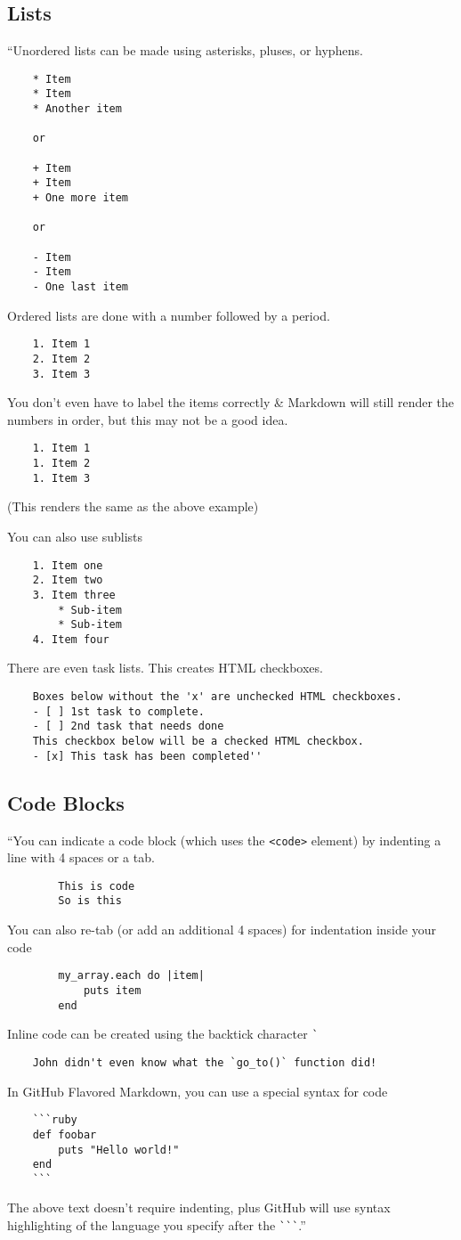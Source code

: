 \documentclass[oneside]{book}
\numberwithin{equation}{section}
\begin{document}
\subsection{Lists}
``Unordered lists can be made using asterisks, pluses, or hyphens.
\begin{verbatim}
	* Item
	* Item
	* Another item
	
	or
	
	+ Item
	+ Item
	+ One more item
	
	or
	
	- Item
	- Item
	- One last item
\end{verbatim}
Ordered lists are done with a number followed by a period.
\begin{verbatim}
	1. Item 1
	2. Item 2
	3. Item 3
\end{verbatim}
You don't even have to label the items correctly \& Markdown will still render the numbers in order, but this may not be a good idea.
\begin{verbatim}
	1. Item 1
	1. Item 2
	1. Item 3
\end{verbatim}
(This renders the same as the above example)

You can also use sublists
\begin{verbatim}
	1. Item one
	2. Item two
	3. Item three
	    * Sub-item
	    * Sub-item
	4. Item four
\end{verbatim}
There are even task lists. This creates HTML checkboxes.
\begin{verbatim}
	Boxes below without the 'x' are unchecked HTML checkboxes.
	- [ ] 1st task to complete.
	- [ ] 2nd task that needs done
	This checkbox below will be a checked HTML checkbox.
	- [x] This task has been completed''
\end{verbatim}

\subsection{Code Blocks}
``You can indicate a code block (which uses the \verb|<code>| element) by indenting a line with 4 spaces or a tab.
\begin{verbatim}
	    This is code
	    So is this
\end{verbatim}
You can also re-tab (or add an additional 4 spaces) for indentation inside your code
\begin{verbatim}
	    my_array.each do |item|
	        puts item
	    end
\end{verbatim}
Inline code can be created using the backtick character \verb|`|
\begin{verbatim}
	John didn't even know what the `go_to()` function did!
\end{verbatim}
In GitHub Flavored Markdown, you can use a special syntax for code
\begin{verbatim}
	```ruby
	def foobar
	    puts "Hello world!"
	end
	```
\end{verbatim}
The above text doesn't require indenting, plus GitHub will use syntax highlighting of the language you specify after the \verb|```|.''
\end{document}
